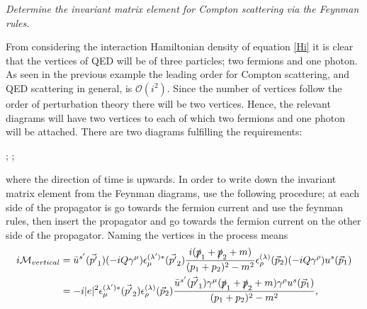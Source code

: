 \begin{example}
	\emph{Determine the invariant matrix element for Compton scattering via the Feynman rules.} \newline
	
	From considering the interaction Hamiltonian density of equation \eqref{Hi} it is clear that the vertices of QED will be of three particles; two fermions and one photon.	As seen in the previous example the leading order for Compton scattering, and QED scattering in general, is $\mathcal{O}(i^2)$. Since the number of vertices follow the order of perturbation theory there will be two vertices. Hence, the relevant diagrams will have two vertices to each of which two fermions and one photon will be attached. There are two diagrams fulfilling the requirements:
	\begin{center}
		; \qquad
		;
	\end{center}
	where the direction of time is upwards. In order to write down the invariant matrix element from the Feynman diagrams, use the following procedure; at each side of the propagator is go towards the fermion current and use the feynman rules, then insert the propagator and go towards the fermion current on the other side of the propagator. Naming the vertices in the process means
	\begin{equation}
		\begin{split}
			i\mathcal{M}_{vertical}&=\bar{u}^{s'}(\vec{p'}_1)(-iQ\gamma^\mu)\epsilon^{(\lambda')*}_{\mu}(\vec{p'}_2)\frac{i(\slashed p_1+\slashed p_2+m)}{(p_1+p_2)^2-m^2}\epsilon^{(\lambda)}_{\rho}(\vec{p}_2)(-iQ\gamma^\rho)
			u^s(\vec{p}_1)\\
			&=-i|e|^2\epsilon^{(\lambda')*}_{\mu}(\vec{p'}_2)\epsilon^{(\lambda)}_{\rho}(\vec{p}_2)\frac{\bar{u}^{s'}(\vec{p'}_1)\gamma^\mu(\slashed p_1+\slashed p_2+m)\gamma^\rho u^s(\vec{p}_1)}{(p_1+p_2)^2-m^2},

\end{split}
\end{equation}
\end{example}
